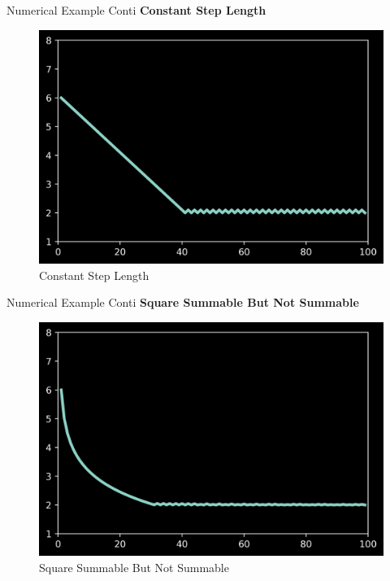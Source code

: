 \documentclass{beamer}
\begin{document}
\begin{frame}{Numerical Example Conti}
    \textbf{Constant Step Length}
    \begin{figure}[H]
        \centering
        \includegraphics[scale=0.5]{../../step/constantsteplength.png}
        \caption{Constant Step Length}
        \label{constantsteplength}
    \end{figure}
\end{frame}


\begin{frame}{Numerical Example Conti}
    \textbf{Square Summable But Not Summable}
    \begin{figure}[H]
        \centering
        \includegraphics[scale=0.5]{../../step/squaresummablebutnotsummable.png}
        \caption{Square Summable But Not Summable}
        \label{squaresummablebutnotsummable}
    \end{figure}
\end{frame}
\end{document}

